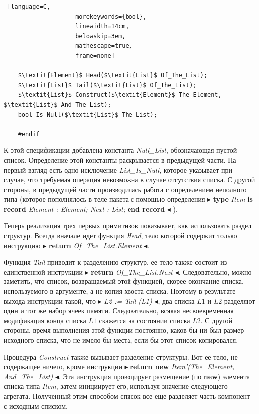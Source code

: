 \documentclass{../../template/mai_book}
\begin{document}
\newpage


\begin{lstlisting} [language=C,
					morekeywords={bool},
					linewidth=14cm,
					belowskip=3em,
					mathescape=true,
					frame=none]
	
	$\textit{Element}$ Head($\textit{List}$ Of_The_List);
	$\textit{List}$ Tail($\textit{List}$ Of_The_List);
	$\textit{List}$ Construct($\textit{Element}$ The_Element, $\textit{List}$ And_The_List);
	bool Is_Null($\textit{List}$ The_List);

	#endif
\end{lstlisting}

К этой спецификации добавлена константа \textit{Null\_List}, обозначающая пустой список. Определение этой константы раскрывается в предыдущей части. На первый взгляд есть одно исключение \textit{List\_Is\_Null}, которое указывает при случае, что требуемая операция невозможна в случае отсутствия списка. С другой стороны, в предыдущей части производилась работа с определением неполного типа (которое пополнялось в теле пакета с помощью определения $\blacktriangleright$ \textbf{type} \textit{Item} \textbf{is record} \textit{Element : Element; Next : List;} \textbf{end record} $\blacktriangleleft$ ).

Теперь реализация трех первых примитивов показывает, как использовать раздел структур. Всегда вначале идет функция \textit{Head}, тело которой содержит только инструкцию $\blacktriangleright$ \textbf{return} \textit{Of\_The\_List.Element} $\blacktriangleleft$.

Функция \textit{Tail} приводит к разделению структур, ее тело также состоит из единственной инструкции $\blacktriangleright$ \textbf{return} \textit{Of\_The\_List.Next} $\blacktriangleleft$. Следовательно, можно заметить, что список, возвращаемый этой функцией, скорее окончание списка, используемого в аргументе, а не копия хвоста списка. Поэтому в результате выхода инструкции такой, что $\blacktriangleright$ \textit{L2 := Tail (L1)} $\blacktriangleleft$, два списка $L1$ и $L2$ разделяют один и тот же набор ячеек памяти. Следовательно, всякая несвоевременная модификация конца списка $L1$ скажется на состоянии списка $L2$. С другой стороны, время выполнения этой функции постоянно, каков бы ни был размер исходного списка, что не имело бы места, если бы этот список копировался.

Процедура \textit{Construct} также вызывает разделение структуры. Вот ее тело, не содержащее ничего, кроме инструкции $\blacktriangleright$ \textbf{return new} \textit{Item'(\linebreak The\_Element, And\_The\_List)} $\blacktriangleleft$. Эта инструкция провоцирует размещение (по \textbf{new}) элемента списка типа \textit{Item}, затем инициирует его, используя значение следующего агрегата. Полученный этим способом список все еще разделяет часть компонент с исходным списком.
\end{document}
